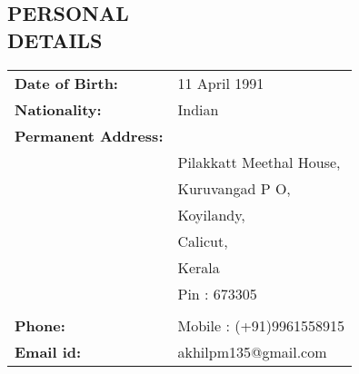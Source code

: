 \documentclass[line,margin]{res}
\begin{document}
\begin{resume}
          \section{PERSONAL \\ DETAILS}
	  	  \begin{tabular}{ l l }
	    	  {\bf Date of Birth:}&11 April 1991\\
	    	  {\bf Nationality:}&Indian\\
	    	  {\bf Permanent Address:}& \\
	    	  &Pilakkatt Meethal House,\\
	    	  &Kuruvangad P O,\\
	    	  &Koyilandy,\\
	    	  &Calicut,\\
		  &Kerala\\
	    	  &Pin : 673305\\\\
	    	  {\bf Phone:}&Mobile : (+91)9961558915 \\
	    	  {\bf Email id:} &akhilpm135@gmail.com\\
	  	  \end{tabular}
\end{resume}
\end{document}

